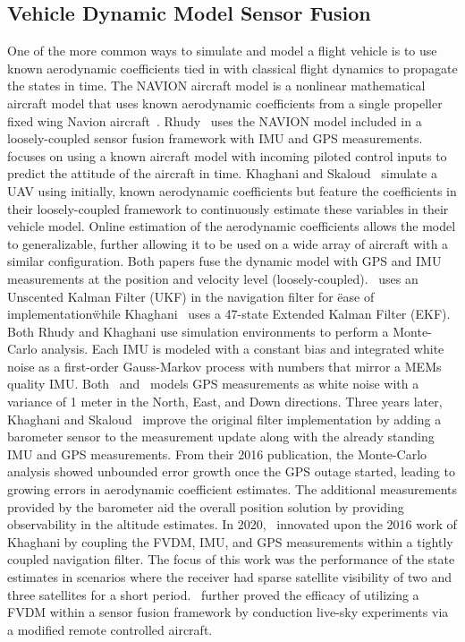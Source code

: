\subsection{\textbf{Vehicle Dynamic Model Sensor Fusion}}
One of the more common ways to simulate and model a flight vehicle is to use known aerodynamic coefficients tied in with classical flight dynamics to propagate the states in time. The NAVION aircraft model is a nonlinear mathematical aircraft model that uses known aerodynamic coefficients from a single propeller fixed wing Navion aircraft~\cite{nelsonFlightStabilityAutomatic1998}. Rhudy~\cite{rhudyDynamicModelaidedSensor2017} uses the NAVION model included in a loosely-coupled sensor fusion framework with IMU and GPS measurements.~\cite{rhudyDynamicModelaidedSensor2017} focuses on using a known aircraft model with incoming piloted control inputs to predict the attitude of the aircraft in time. Khaghani and Skaloud~\cite{khaghaniAutonomousVehicleDynamic2016} simulate a UAV using initially, known aerodynamic coefficients but feature the coefficients in their loosely-coupled framework to continuously estimate these variables in their vehicle model. Online estimation of the aerodynamic coefficients allows the model to generalizable, further allowing it to be used on a wide array of aircraft with a similar configuration. Both papers fuse the dynamic model with GPS and IMU measurements at the position and velocity level (loosely-coupled).~\cite{rhudyDynamicModelaidedSensor2017} uses an Unscented Kalman Filter (UKF) in the navigation filter for \"ease of implementation\" while Khaghani~\cite{khaghaniAutonomousVehicleDynamic2016,khaghaniAssessmentVDMbasedAutonomous2018} uses a 47-state Extended Kalman Filter (EKF). Both Rhudy and Khaghani use simulation environments to perform a Monte-Carlo analysis. Each IMU is modeled with a constant bias and integrated white noise as a first-order Gauss-Markov process with numbers that mirror a MEMs quality IMU\@. Both~\cite{khaghaniAutonomousVehicleDynamic2016} and~\cite{rhudyDynamicModelaidedSensor2017} models GPS measurements as white noise with a variance of 1 meter in the North, East, and Down directions. Three years later, Khaghani and Skaloud~\cite{khaghaniAssessmentVDMbasedAutonomous2018} improve the original filter implementation by adding a barometer sensor to the measurement update along with the already standing IMU and GPS measurements. From their 2016 publication, the Monte-Carlo analysis showed unbounded error growth once the GPS outage started, leading to growing errors in aerodynamic coefficient estimates. The additional measurements provided by the barometer aid the overall position solution by providing observability in the altitude estimates. In 2020,~\cite{mwenegohaModelbasedTightlyCoupled2020} innovated upon the 2016 work of Khaghani by coupling the FVDM, IMU, and GPS measurements within a tightly coupled navigation filter. The focus of this work was the performance of the state estimates in scenarios where the receiver had sparse satellite visibility of two and three satellites for a short period.~\cite{mwenegohaModelbasedTightlyCoupled2020} further proved the efficacy of utilizing a FVDM within a sensor fusion framework by conduction live-sky experiments via a modified remote controlled aircraft.

